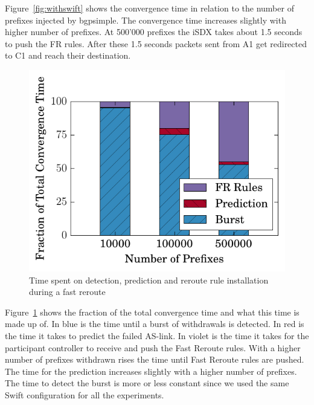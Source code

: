 Figure~\ref{fig:withswift} shows the convergence time in relation to the number of prefixes injected by bgpsimple.
The convergence time increases slightly with higher number of prefixes. At 500'000 prefixes the iSDX takes about 1.5 seconds to push the FR rules. After these 1.5 seconds packets sent from A1 get redirected to C1 and reach their destination. 

\begin{figure}[h]
\center
\includegraphics[scale = 1]{Figures/barplot.pdf}
\caption{Time spent on detection, prediction and reroute rule installation during a fast reroute}
\label{fig:activities}
\end{figure}


Figure~\ref{fig:activities} shows the fraction of the total convergence time and what this time is made up of. In blue is the time until a burst of withdrawals is detected. In red is the time it takes to predict the failed AS-link. In violet is the time it takes for the participant controller to receive and push the Fast Reroute rules. With a higher number of prefixes withdrawn rises the time until Fast Reroute rules are pushed. The time for the prediction increases slightly with a higher number of prefixes. The time to detect the burst is more or less constant since we used the same Swift configuration for all the experiments. 

